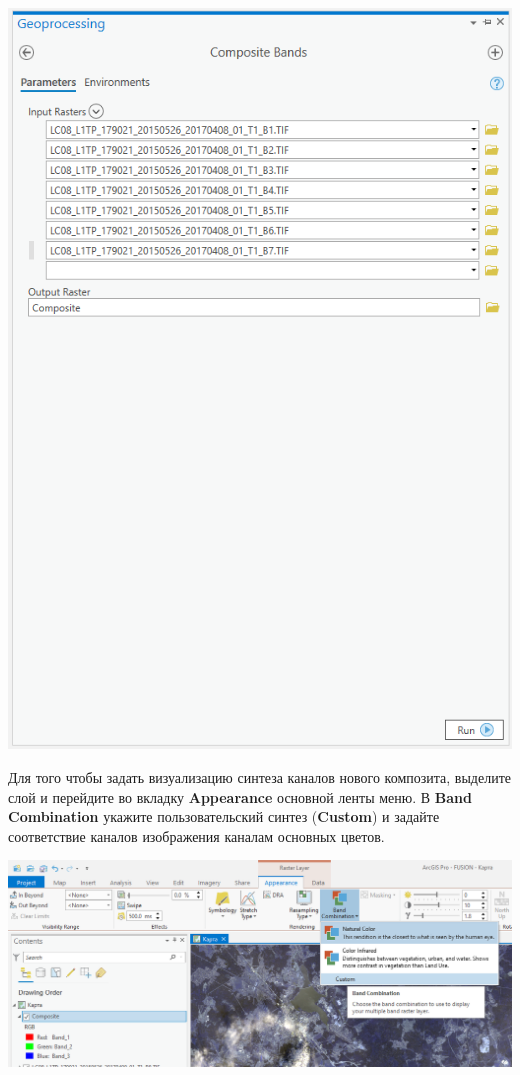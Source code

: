 \documentclass[
  12pt,
]{book}
\begin{document}
\includegraphics{images/Ref01/Composite_bands.png}

Для того чтобы задать визуализацию синтеза каналов нового композита, выделите слой и перейдите во вкладку \textbf{Appearance} основной ленты меню. В \textbf{Band Combination} укажите пользовательский синтез (\textbf{Custom}) и задайте соответствие каналов изображения каналам основных цветов.

\includegraphics{images/Ref01/Band_combination.png}
\end{document}
